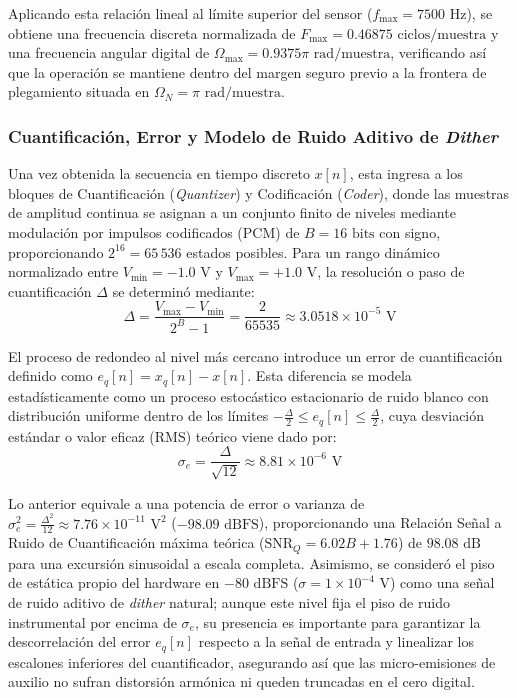 \documentclass[11pt, a4paper]{article}
\begin{document}
Aplicando esta relación lineal al límite superior del sensor ($f_{\max} = 7500\text{ Hz}$), se obtiene una frecuencia discreta normalizada de $F_{\max} = 0.46875\text{ ciclos/muestra}$ y una frecuencia angular digital de $\Omega_{\max} = 0.9375\pi\text{ rad/muestra}$, verificando así que la operación se mantiene dentro del margen seguro previo a la frontera de plegamiento situada en $\Omega_N = \pi\text{ rad/muestra}$.

\subsubsection{Cuantificación, Error y Modelo de Ruido Aditivo de \textit{Dither}}
Una vez obtenida la secuencia en tiempo discreto $x[n]$, esta ingresa a los bloques de Cuantificación (\textit{Quantizer}) y Codificación (\textit{Coder}), donde las muestras de amplitud continua se asignan a un conjunto finito de niveles mediante modulación por impulsos codificados (PCM) de $B = 16 \text{ bits}$ con signo, proporcionando $2^{16} = 65\,536$ estados posibles. Para un rango dinámico normalizado entre $V_{\min} = -1.0\text{ V}$ y $V_{\max} = +1.0\text{ V}$, la resolución o paso de cuantificación $\Delta$ se determinó mediante:
\begin{equation}
    \Delta = \frac{V_{\max} - V_{\min}}{2^B - 1} = \frac{2}{65535} \approx 3.0518 \times 10^{-5} \text{ V}
\end{equation}

El proceso de redondeo al nivel más cercano introduce un error de cuantificación definido como $e_q[n] = x_q[n] - x[n]$. Esta diferencia se modela estadísticamente como un proceso estocástico estacionario de ruido blanco con distribución uniforme dentro de los límites $-\frac{\Delta}{2} \le e_q[n] \le \frac{\Delta}{2}$, cuya desviación estándar o valor eficaz (RMS) teórico viene dado por:
\begin{equation}
    \sigma_e = \frac{\Delta}{\sqrt{12}} \approx 8.81 \times 10^{-6} \text{ V}
\end{equation}

Lo anterior equivale a una potencia de error o varianza de $\sigma_e^2 = \frac{\Delta^2}{12} \approx 7.76 \times 10^{-11} \text{ V}^2$ ($-98.09\text{ dBFS}$), proporcionando una Relación Señal a Ruido de Cuantificación máxima teórica ($\text{SNR}_Q = 6.02 B + 1.76$) de $98.08 \text{ dB}$ para una excursión sinusoidal a escala completa. Asimismo, se consideró el piso de estática propio del hardware en $-80 \text{ dBFS}$ ($\sigma = 1 \times 10^{-4}\text{ V}$) como una señal de ruido aditivo de \textit{dither} natural; aunque este nivel fija el piso de ruido instrumental por encima de $\sigma_e$, su presencia es importante para garantizar la descorrelación del error $e_q[n]$ respecto a la señal de entrada y linealizar los escalones inferiores del cuantificador, asegurando así que las micro-emisiones de auxilio no sufran distorsión armónica ni queden truncadas en el cero digital.
\end{document}
